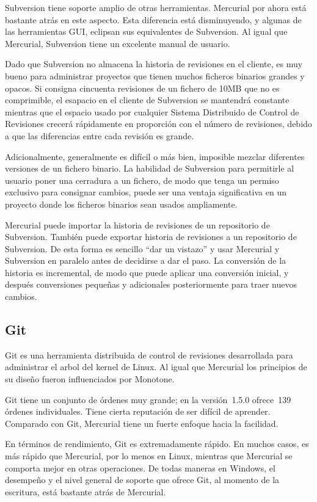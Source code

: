 Subversion tiene soporte amplio de otras herramientas. Mercurial por
ahora está bastante atrás en este aspecto.  Esta diferencia está
disminuyendo, y algunas de las herramientas GUI, eclipsan sus equivalentes de Subversion. Al igual
que Mercurial, Subversion tiene un excelente manual de usuario.

Dado que Subversion no almacena la historia de revisiones en el
cliente, es muy bueno para administrar proyectos que tienen muchos
ficheros binarios grandes y opacos. Si consigna cincuenta revisiones
de un fichero de 10MB que no es comprimible, el esapacio en el cliente
de Subversion se mantendrá constante mientras que el espacio usado por
cualquier Sistema Distribuido de Control de Revisiones crecerá
rápidamente en proporción con el número de revisiones, debido a que
las diferencias entre cada revisión es grande.

Adicionalmente, generalmente es difícil o más bien, imposible mezclar
diferentes versiones de un fichero binario. La habilidad de Subversion
para permitirle al usuario poner una cerradura  a un fichero, de modo
que tenga un permiso exclusivo para consignar cambios, puede ser una
ventaja significativa en un proyecto donde los ficheros binarios sean
usados ampliamente.

Mercurial puede importar la historia de revisiones de un repositorio
de Subversion. También puede exportar historia de revisiones a un
repositorio de Subversion.  De esta forma es sencillo ``dar un
vistazo'' y usar Mercurial y Subversion en paralelo antes de decidirse
a dar el paso. La conversión de la historia es incremental, de modo
que puede aplicar una conversión inicial, y después conversiones
pequeñas y adicionales posteriormente para traer nuevos cambios.

\subsection{Git}

Git es una herramienta distribuida de control de revisiones
desarrollada para administrar el arbol del kernel de Linux.  Al igual
que Mercurial los principios de su diseño fueron influenciados por 
Monotone.

Git tiene un conjunto de órdenes muy grande; en la versión~1.5.0
ofrece~139 órdenes individuales.  Tiene cierta reputación de ser
difícil de aprender. Comparado con Git, Mercurial tiene un fuerte
enfoque hacia la facilidad.

En términos de rendimiento, Git es extremadamente rápido. En muchos
casos, es más rápido que Mercurial, por lo menos en Linux, mientras
que Mercurial se comporta mejor en otras operaciones.  De todas
maneras en Windows, el desempeño y el nivel general de soporte que
ofrece Git, al momento de la escritura, está bastante atrás de
Mercurial.

